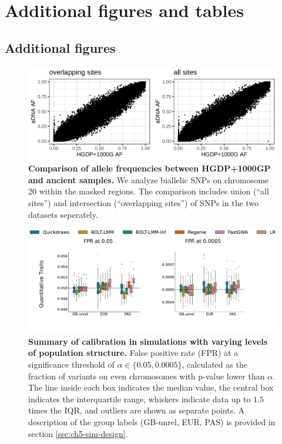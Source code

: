 \chapter{\label{app:2}Additional figures and tables}

\minitoc

\section{Additional figures}
\label{sec:additional_figures}

\begin{figure}
    \centering
    \includegraphics[width=\textwidth]{figures/gb_merge_sanity_check.png}
    \caption{\textbf{Comparison of allele frequencies between HGDP+1000GP and ancient samples.} We analyze biallelic SNPs on chromosome 20 within the masked regions. The comparison includes union (``all sites'') and intersection (``overlapping sites'') of SNPs in the two datasets seperately.}
    \label{fig:gb-sanity-check}
\end{figure}

\begin{figure}[h!]
    \centering
    \includegraphics[width=\textwidth]{figures/sim_calibration/popstructure_fpr.pdf}
    \caption{
    \textbf{Summary of calibration in simulations with varying levels of population structure.}
    False positive rate (FPR) at a significance threshold of $\alpha \in \{0.05, 0.0005\}$, calculated as the fraction of variants on even chromosomes with p-value lower than $\alpha$.
    The line inside each box indicates the median value, the central box indicates the interquartile range, whiskers indicate data up to $1.5$ times the IQR, and outliers are shown as separate points.
    A description of the group labels (GB-unrel, EUR, PAS) is provided in section \ref{sec:ch5-sim-design}.
    }
    \label{fig:sim_calib_pop}
\end{figure}

